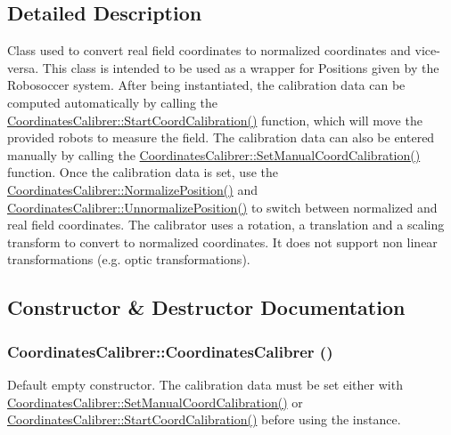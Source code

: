 \subsection{Detailed Description}
Class used to convert real field coordinates to normalized coordinates and vice-\/versa. This class is intended to be used as a wrapper for Positions given by the Robosoccer system. After being instantiated, the calibration data can be computed automatically by calling the \hyperlink{classCoordinatesCalibrer_a2087994adbb8651efcb06e3d7a2315da}{CoordinatesCalibrer::StartCoordCalibration()} function, which will move the provided robots to measure the field. The calibration data can also be entered manually by calling the \hyperlink{classCoordinatesCalibrer_a006c18905b14e4780b9fc74fe26649fc}{CoordinatesCalibrer::SetManualCoordCalibration()} function. Once the calibration data is set, use the \hyperlink{classCoordinatesCalibrer_ad6519b69842756c256922d14d1e248ce}{CoordinatesCalibrer::NormalizePosition()} and \hyperlink{classCoordinatesCalibrer_a8522193b13196313d001c589e7845bd3}{CoordinatesCalibrer::UnnormalizePosition()} to switch between normalized and real field coordinates. The calibrator uses a rotation, a translation and a scaling transform to convert to normalized coordinates. It does not support non linear transformations (e.g. optic transformations). 

\subsection{Constructor \& Destructor Documentation}
\hypertarget{classCoordinatesCalibrer_ac9a522299ada8f2e58ed8f0c91f4f396}{
\subsubsection[{CoordinatesCalibrer}]{\setlength{\rightskip}{0pt plus 5cm}CoordinatesCalibrer::CoordinatesCalibrer ()}}
\label{classCoordinatesCalibrer_ac9a522299ada8f2e58ed8f0c91f4f396}


Default empty constructor. The calibration data must be set either with \hyperlink{classCoordinatesCalibrer_a006c18905b14e4780b9fc74fe26649fc}{CoordinatesCalibrer::SetManualCoordCalibration()} or \hyperlink{classCoordinatesCalibrer_a2087994adbb8651efcb06e3d7a2315da}{CoordinatesCalibrer::StartCoordCalibration()} before using the instance. 

